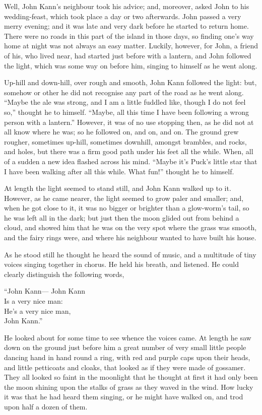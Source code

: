 \documentclass[
  12pt,
  a5paper,
  twoside]{book}
\begin{document}
Well, John Kann's neighbour took his advice; and, moreover, asked John
to his wedding-feast, which took place a day or two afterwards. John
passed a very merry evening; and it was late and very dark before he
started to return home. There were no roads in this part of the island
in those days, so finding one's way home at night was not always an easy
matter. Luckily, however, for John, a friend of his, who lived near, had
started just before with a lantern, and John followed the light, which
was some way on before him, singing to himself as he went along.

Up-hill and down-hill, over rough and smooth, John Kann followed the
light: but, somehow or other he did not recognise any part of the road
as he went along. ``Maybe the ale was strong, and I am a little fuddled
like, though I do not feel so,'' thought he to himself. ``Maybe, all
this time I have been following a wrong person with a lantern.''
However, it was of no use stopping then, as he did not at all know where
he was; so he followed on, and on, and on. The ground grew rougher,
sometimes up-hill, sometimes downhill, amongst brambles, and rocks, and
holes, but there was a firm good path under his feet all the while.
When, all of a sudden a new idea flashed across his mind. ``Maybe it's
Puck's little star that I have been walking after all this while. What
fun!'' thought he to himself.

At length the light seemed to stand still, and John Kann walked up to
it. However, as he came nearer, the light seemed to grow paler and
smaller; and, when he got close to it, it was no bigger or brighter than
a glow-worm's tail, so he was left all in the dark; but just then the
moon glided out from behind a cloud, and showed him that he was on the
very spot where the grass was smooth, and the fairy rings were, and
where his neighbour wanted to have built his house.

As he stood still he thought he heard the sound of music, and a
multitude of tiny voices singing together in chorus. He held his breath,
and listened. He could clearly distinguish the following words,

``John Kann--- John Kann\\
Is a very nice man:\\
He's a very nice man,\\
John Kann.''

He looked about for some time to see whence the voices came. At length
he saw down on the ground just before him a great number of very small
little people dancing hand in hand round a ring, with red and purple
caps upon their heads, and little petticoats and cloaks, that looked as
if they were made of gossamer. They all looked so faint in the moonlight
that he thought at first it had only been the moon shining upon the
stalks of grass as they waved in the wind. How lucky it was that he had
heard them singing, or he might have walked on, and trod upon half a
dozen of them.
\end{document}
